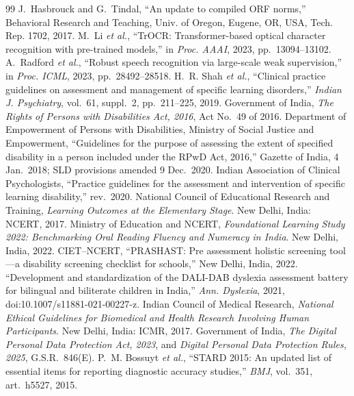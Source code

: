 \documentclass[conference]{IEEEtran}
\begin{document}
\begin{thebibliography}{99}
 J.~Hasbrouck and G.~Tindal, ``An update to compiled ORF norms,'' Behavioral Research and Teaching, Univ. of Oregon, Eugene, OR, USA, Tech. Rep. 1702, 2017.
 M.~Li \emph{et al.}, ``TrOCR: Transformer-based optical character recognition with pre-trained models,'' in \emph{Proc. AAAI}, 2023, pp.~13094--13102.
 A.~Radford \emph{et al.}, ``Robust speech recognition via large-scale weak supervision,'' in \emph{Proc. ICML}, 2023, pp.~28492--28518.
 H.~R. Shah \emph{et al.}, ``Clinical practice guidelines on assessment and management of specific learning disorders,'' \emph{Indian J. Psychiatry}, vol.~61, suppl.~2, pp.~211--225, 2019.
 Government of India, \emph{The Rights of Persons with Disabilities Act, 2016}, Act No.~49 of 2016.
 Department of Empowerment of Persons with Disabilities, Ministry of Social Justice and Empowerment, ``Guidelines for the purpose of assessing the extent of specified disability in a person included under the RPwD Act, 2016,'' Gazette of India, 4 Jan.~2018; SLD provisions amended 9 Dec.~2020.
 Indian Association of Clinical Psychologists, ``Practice guidelines for the assessment and intervention of specific learning disability,'' rev.~2020.
 National Council of Educational Research and Training, \emph{Learning Outcomes at the Elementary Stage}. New Delhi, India: NCERT, 2017.
 Ministry of Education and NCERT, \emph{Foundational Learning Study 2022: Benchmarking Oral Reading Fluency and Numeracy in India}. New Delhi, India, 2022.
 CIET--NCERT, ``PRASHAST: Pre assessment holistic screening tool---a disability screening checklist for schools,'' New Delhi, India, 2022.
 ``Development and standardization of the DALI-DAB dyslexia assessment battery for bilingual and biliterate children in India,'' \emph{Ann. Dyslexia}, 2021, doi:10.1007/s11881-021-00227-z.
 Indian Council of Medical Research, \emph{National Ethical Guidelines for Biomedical and Health Research Involving Human Participants}. New Delhi, India: ICMR, 2017.
 Government of India, \emph{The Digital Personal Data Protection Act, 2023}, and \emph{Digital Personal Data Protection Rules, 2025}, G.S.R.~846(E).
 P.~M. Bossuyt \emph{et al.}, ``STARD 2015: An updated list of essential items for reporting diagnostic accuracy studies,'' \emph{BMJ}, vol.~351, art.~h5527, 2015.
\end{thebibliography}
\end{document}
